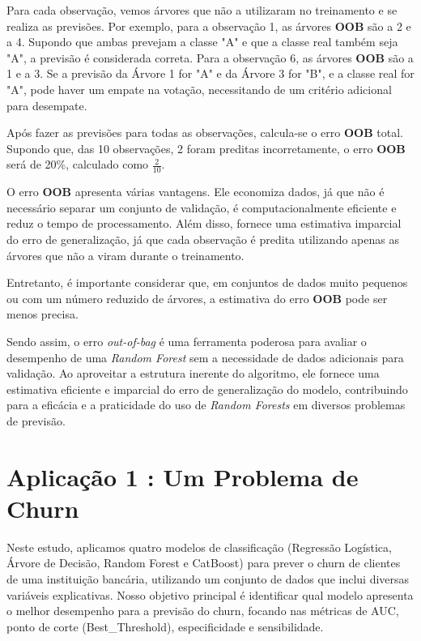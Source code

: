 \documentclass[a4paper,12pt]{article}[abntex2]
\begin{document}
Para cada observação, vemos árvores que não a utilizaram no treinamento e se realiza as previsões. Por exemplo, para a observação 1, as árvores \textbf{OOB} são a 2 e a 4. Supondo que ambas prevejam a classe "A" e que a classe real também seja "A", a previsão é considerada correta. Para a observação 6, as árvores \textbf{OOB} são a 1 e a 3. Se a previsão da Árvore 1 for "A" e da Árvore 3 for "B", e a classe real for "A", pode haver um empate na votação, necessitando de um critério adicional para desempate.

Após fazer as previsões para todas as observações, calcula-se o erro \textbf{OOB} total. Supondo que, das 10 observações, 2 foram preditas incorretamente, o erro \textbf{OOB} será de 20\%, calculado como \( \frac{2}{10} \).

O erro \textbf{OOB} apresenta várias vantagens. Ele economiza dados, já que não é necessário separar um conjunto de validação, é computacionalmente eficiente e reduz o tempo de processamento. Além disso, fornece uma estimativa imparcial do erro de generalização, já que cada observação é predita utilizando apenas as árvores que não a viram durante o treinamento.

Entretanto, é importante considerar que, em conjuntos de dados muito pequenos ou com um número reduzido de árvores, a estimativa do erro \textbf{OOB} pode ser menos precisa.

Sendo assim, o erro \textit{out-of-bag} é uma ferramenta poderosa para avaliar o desempenho de uma \textit{Random Forest} sem a necessidade de dados adicionais para validação. Ao aproveitar a estrutura inerente do algoritmo, ele fornece uma estimativa eficiente e imparcial do erro de generalização do modelo, contribuindo para a eficácia e a praticidade do uso de \textit{Random Forests} em diversos problemas de previsão.


\newpage
\section*{\textbf{Aplicação 1 : Um Problema de Churn}}

Neste estudo, aplicamos quatro modelos de classificação (Regressão Logística, Árvore de Decisão, Random Forest e CatBoost) para prever o churn de clientes de uma instituição bancária, utilizando um conjunto de dados que inclui diversas variáveis explicativas. Nosso objetivo principal é identificar qual modelo apresenta o melhor desempenho para a previsão do churn, focando nas métricas de AUC, ponto de corte (Best\_Threshold), especificidade e sensibilidade. 
\end{document}
